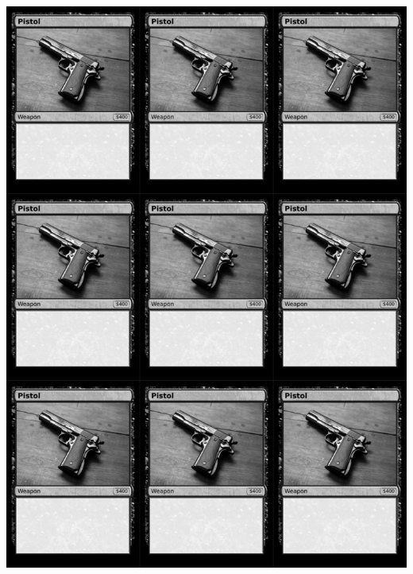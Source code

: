 \documentclass[a4paper]{article}
\begin{document}
\newpage

\begin{center}
	\centering
	\includegraphics[width=200.5mm,height=280.7mm]{output/temp/page7.png}
\end{center}
\end{document}
